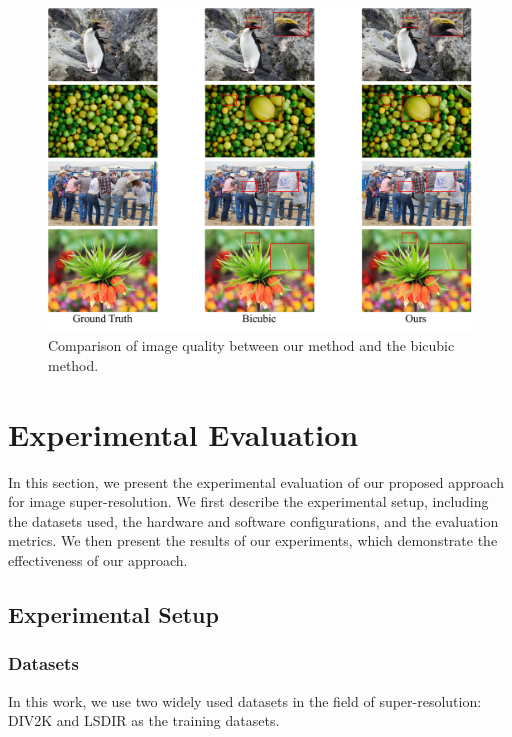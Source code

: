 \documentclass[10pt,twocolumn,letterpaper]{article}
\begin{document}
\begin{figure}[t]
    \begin{center}
    \includegraphics[width=\textwidth]{../x4result.pdf}
    \end{center}
    \caption{Comparison of image quality between our method and the bicubic method.}
    \label{fig:result}
\end{figure}

\section{Experimental Evaluation}
\label{sec:exp}
In this section, we present the experimental evaluation of our proposed approach for image super-resolution. We first describe the experimental setup, including the datasets used, the hardware and software configurations, and the evaluation metrics. We then present the results of our experiments, which demonstrate the effectiveness of our approach.

\subsection{Experimental Setup}

\subsubsection{Datasets}
In this work, we use two widely used datasets in the field of super-resolution: DIV2K\cite{div2k} and LSDIR\cite{lilsdir} as the training datasets.
\end{document}
